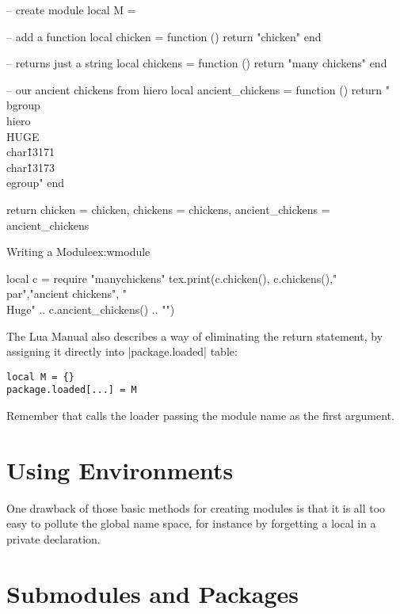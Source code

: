 \begin{lualisting}[keywordstyle=\underbar,emph={local},emphstyle=\underbar,]
-- create module
local M = {}

-- add a function
local chicken = function ()
  return "chicken"
end

-- returns just a string
local chickens = function ()
  return "many chickens" 
end

-- our ancient chickens from hiero
local ancient_chickens = function ()
  return "\\bgroup\\hiero\\HUGE\\char\"13171 \\char\"13173\\egroup"
end

return {chicken                = chicken,
        chickens               = chickens,
        ancient_chickens       = ancient_chickens}
\end{lualisting}


\begin{texexample}{Writing a Module}{ex:wmodule}
\begin{luacode*}
   local c = require "manychickens"
   tex.print(c.chicken(), c.chickens(),"\\par","ancient chickens", "{\\Huge" .. c.ancient_chickens() .. "}")
\end{luacode*}
\end{texexample}



The Lua Manual also describes a way of eliminating the return statement, by assigning it directly into |package.loaded| table:

\begin{verbatim}
local M = {}
package.loaded[...] = M
\end{verbatim}

Remember that  calls the loader passing the module name as the first argument.

\section{Using Environments}

One drawback of those basic methods for creating modules is that it is all too easy to pollute the global name space, for instance by forgetting a local in a private declaration.

\section{Submodules and Packages}

